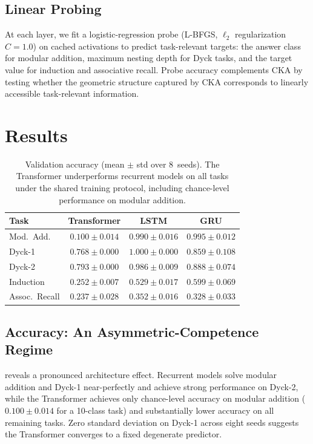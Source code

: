 \documentclass{article}
\begin{document}
\subsection{Linear Probing}

At each layer, we fit a logistic-regression probe (L-BFGS, 
$\ell_2$ regularization $C\!=\!1.0$) on cached activations to 
predict task-relevant targets: the answer class for modular 
addition, maximum nesting depth for Dyck tasks, and the target 
value for induction and associative recall. Probe accuracy 
complements CKA by testing whether the geometric structure 
captured by CKA corresponds to linearly accessible 
task-relevant information.

\section{Results}
\label{sec:results}

\begin{table}[t]
\caption{Validation accuracy (mean $\pm$ std over 8~seeds). The 
Transformer underperforms recurrent models on all tasks under 
the shared training protocol, including chance-level performance 
on modular addition.}
\label{tab:accuracy}
\centering
\small
\begin{tabular}{lccc}
\toprule
Task & Transformer & LSTM & GRU \\
\midrule
Mod.\ Add. & $0.100 \pm 0.014$ & $0.990 \pm 0.016$ 
& $0.995 \pm 0.012$ \\
Dyck-1 & $0.768 \pm 0.000$ & $1.000 \pm 0.000$ 
& $0.859 \pm 0.108$ \\
Dyck-2 & $0.793 \pm 0.000$ & $0.986 \pm 0.009$ 
& $0.888 \pm 0.074$ \\
Induction & $0.252 \pm 0.007$ & $0.529 \pm 0.017$ 
& $0.599 \pm 0.069$ \\
Assoc.\ Recall & $0.237 \pm 0.028$ & $0.352 \pm 0.016$ 
& $0.328 \pm 0.033$ \\
\bottomrule
\end{tabular}
\end{table}

\subsection{Accuracy: An Asymmetric-Competence Regime}
\label{sec:accuracy}

 reveals a pronounced architecture effect. 
Recurrent models solve modular addition and Dyck-1 near-perfectly 
and achieve strong performance on Dyck-2, while the Transformer 
achieves only chance-level accuracy on modular addition 
($0.100 \pm 0.014$ for a 10-class task) and substantially lower 
accuracy on all remaining tasks. Zero standard deviation on 
Dyck-1 across eight seeds suggests the Transformer converges to a 
fixed degenerate predictor.
\end{document}
